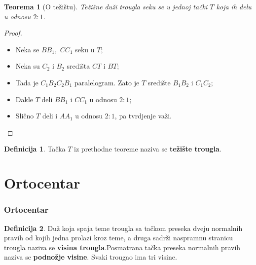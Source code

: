\documentclass{beamer}
\newtheorem{teorema}{{Teorema}}[section]
\theoremstyle{definition}
\newtheorem{definicija}{{Definicija}}
\begin{document}
\begin{frame} %

		\begin{teorema}[O te\v{z}i\v{s}tu]
Te\v{z}i\v{s}ne du\v{z}i trougla seku se u jednoj ta\v{c}ki $T$ koja ih delu u odnosu $2:1$.
\end{teorema}

		\begin{center}
		\end{center}
		
		\pause
		
		\begin{proof}
			\begin{itemize}
				\item<2-> Neka se  $BB_1,$ $CC_1$ seku u $T$;
				\item<3-> Neka su $C_2$ i $B_2$ sredi\v{s}ta $CT$ i $BT$;
				\item<4-> Tada je $C_1B_2C_2B_1$ paralelogram.  Zato je $T$ sredi\v{s}te $B_1B_2$ i $C_1C_2$;
				\item<5-> Dakle $T$ deli $BB_1$ i  $CC_1$ u odnosu $2:1$;
				\item<6-> Sli\v{c}no $T$ deli i $AA_1$ u odnosu $2:1$, pa tvrdjenje va\v{z}i.
				\qedhere
			\end{itemize}
		\end{proof}
		
	\end{frame} 
	
\begin{frame}
\begin{definicija}
Ta\v{c}ka $T$ iz prethodne teoreme naziva se \alert{\bf te\v{z}i\v{s}te trougla}.
\end{definicija}
    
\end{frame}

\section{Ortocentar}
\begin{frame}
\frametitle{\bf Ortocentar}
\pause
\begin{definicija}
Du\v{z} koja spaja teme trougla sa ta\v{c}kom preseka dveju normalnih pravih od kojih jedna prolazi kroz teme, a druga sadr\v{z}i naspramnu stranicu trougla naziva se \alert{\bf visina trougla}.\pause Posmatrana ta\v{c}ka preseka normalnih pravih naziva se \alert{\bf podno\v{z}je visine}. \pause Svaki trougao ima tri visine.
\end{definicija}
\pause
	\begin{center}
			\resizebox{2.5in}{!}{}
		\end{center}
		\end{frame}
		
\end{document}
